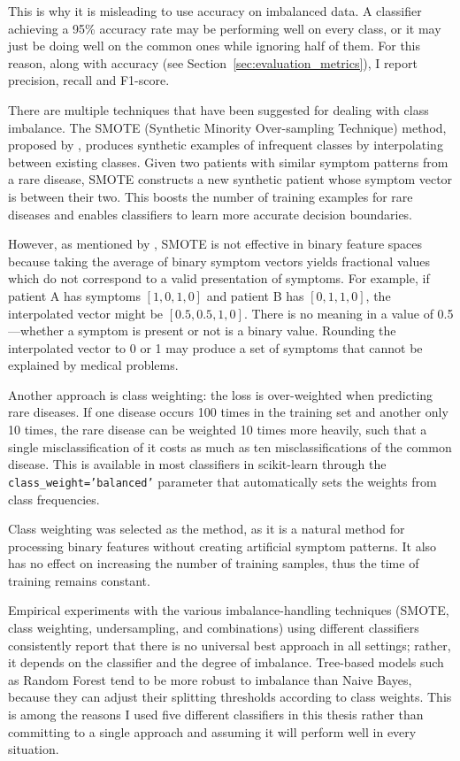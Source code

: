 This is why it is misleading to use accuracy on imbalanced data. A classifier achieving a 95\% accuracy rate may be performing well on every class, or it may just be doing well on the common ones while ignoring half of them. For this reason, along with accuracy (see Section~\ref{sec:evaluation_metrics}), I report precision, recall and F1-score.

There are multiple techniques that have been suggested for dealing with class imbalance. The SMOTE (Synthetic Minority Over-sampling Technique) method, proposed by \citet{Chawla2002}, produces synthetic examples of infrequent classes by interpolating between existing classes. Given two patients with similar symptom patterns from a rare disease, SMOTE constructs a new synthetic patient whose symptom vector is between their two. This boosts the number of training examples for rare diseases and enables classifiers to learn more accurate decision boundaries.

However, as mentioned by \citet{Fernandez2018}, SMOTE is not effective in binary feature spaces because taking the average of binary symptom vectors yields fractional values which do not correspond to a valid presentation of symptoms. For example, if patient A has symptoms $[1, 0, 1, 0]$ and patient B has $[0, 1, 1, 0]$, the interpolated vector might be $[0.5, 0.5, 1, 0]$. There is no meaning in a value of 0.5---whether a symptom is present or not is a binary value. Rounding the interpolated vector to 0 or 1 may produce a set of symptoms that cannot be explained by medical problems.

Another approach is class weighting: the loss is over-weighted when predicting rare diseases. If one disease occurs 100 times in the training set and another only 10 times, the rare disease can be weighted 10 times more heavily, such that a single misclassification of it costs as much as ten misclassifications of the common disease. This is available in most classifiers in scikit-learn through the \texttt{class\_weight='balanced'} parameter that automatically sets the weights from class frequencies.

Class weighting was selected as the method, as it is a natural method for processing binary features without creating artificial symptom patterns. It also has no effect on increasing the number of training samples, thus the time of training remains constant.

Empirical experiments with the various imbalance-handling techniques (SMOTE, class weighting, undersampling, and combinations) using different classifiers consistently report that there is no universal best approach in all settings; rather, it depends on the classifier and the degree of imbalance. Tree-based models such as Random Forest tend to be more robust to imbalance than Naive Bayes, because they can adjust their splitting thresholds according to class weights. This is among the reasons I used five different classifiers in this thesis rather than committing to a single approach and assuming it will perform well in every situation.

